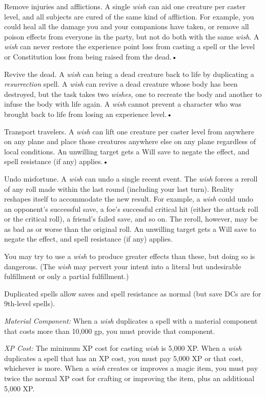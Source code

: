 \documentclass{article}
\begin{document}
Remove injuries and afflictions. A single \textit{wish }can aid one creature per 
caster level, and all subjects are cured of the same kind of affliction. For example, 
you could heal all the damage you and your companions have taken, or remove all 
poison effects from everyone in the party, but not do both with the same \textit{wish}. 
A \textit{wish }can never restore the experience point loss from casting a spell 
or the level or Constitution loss from being raised from the dead.• 

Revive the dead. A \textit{wish }can bring a dead creature back to life by duplicating 
a \textit{resurrection }spell. A \textit{wish }can revive a dead creature whose 
body has been destroyed, but the task takes two \textit{wishes, }one to recreate 
the body and another to infuse the body with life again. A \textit{wish }cannot 
prevent a character who was brought back to life from losing an experience level.• 

Transport travelers. A \textit{wish }can lift one creature per caster level from 
anywhere on any plane and place those creatures anywhere else on any plane regardless 
of local conditions. An unwilling target gets a Will save to negate the effect, 
and spell resistance (if any) applies.• 

Undo misfortune. A \textit{wish }can undo a single recent event. The \textit{wish 
}forces a reroll of any roll made within the last round (including your last turn). 
Reality reshapes itself to accommodate the new result. For example, a \textit{wish 
}could undo an opponent's successful save, a foe's successful critical hit (either 
the attack roll or the critical roll), a friend's failed save, and so on. The reroll, 
however, may be as bad as or worse than the original roll. An unwilling target 
gets a Will save to negate the effect, and spell resistance (if any) applies.

You may try to use a \textit{wish }to produce greater effects than these, but doing 
so is dangerous. (The \textit{wish }may pervert your intent into a literal but 
undesirable fulfillment or only a partial fulfillment.)

Duplicated spells allow saves and spell resistance as normal (but save DCs are 
for 9th-level spells).

\textit{Material Component: }When a \textit{wish }duplicates a spell with a material 
component that costs more than 10,000 gp, you must provide that component.

\textit{XP Cost: }The minimum XP cost for casting \textit{wish }is 5,000 XP. When 
a \textit{wish }duplicates a spell that has an XP cost, you must pay 5,000 XP or 
that cost, whichever is more. When a \textit{wish }creates or improves a magic 
item, you must pay twice the normal XP cost for crafting or improving the item, 
plus an additional 5,000 XP.
\end{document}
